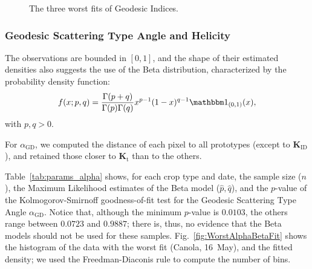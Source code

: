 \documentclass[journal]{IEEEtran}
\begin{document}
{\begin{figure}[hbt]
	\centering
	\caption{The three worst fits of Geodesic Indices.}
\end{figure}

\subsubsection{Geodesic Scattering Type Angle and Helicity}

The observations are bounded in $[0,1]$, 
and the shape of their estimated densities also suggests the use of the Beta distribution, characterized by the probability density function:
\begin{equation}
	f(x; p, q) = \frac{\Gamma(p+q)}{\Gamma(p)\Gamma(q)} x^{p-1} (1-x)^{q-1} \mathbbm 1_{(0,1)}(x),
	\label{eq:BetaDensity}
\end{equation}
with $p,q>0$.

For $\alpha_{\text{GD}}$, we computed the distance of each pixel to all prototypes (except to $\bm K_{\text{ID}}$), and retained those closer to $\bm K_{\text{t}}$ than to the others.

Table~\ref{tab:params_alpha} shows, for each crop type and date, 
the sample size ($n$), 
the Maximum Likelihood estimates of the Beta model ($\widehat p,\widehat q$), and the $p$-value of the Kolmogorov-Smirnoff goodness-of-fit test for the Geodesic Scattering Type Angle $\alpha_{\text{GD}}$.
Notice that, although the minimum $p$-value is $0.0103$, the others range between $0.0723$ and $0.9887$; there is, thus, no evidence that the Beta models should not be used for these samples.
Fig.~\ref{fig:WorstAlphaBetaFit} shows the histogram of the data with the worst fit (Canola, 16~May), and the fitted density; we used the Freedman-Diaconis rule to compute the number of bins.

}
\end{document}
